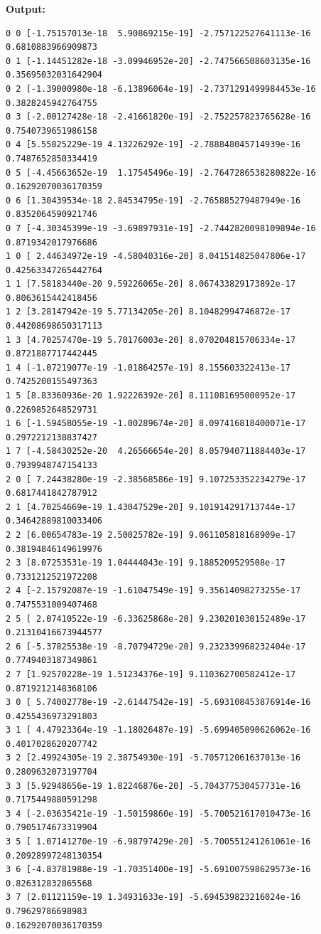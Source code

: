 \documentclass{article}
\begin{document}
\textbf{Output:}\begin{verbatim}
0 0 [-1.75157013e-18  5.90869215e-19] -2.757122527641113e-16 0.6810883966909873
0 1 [-1.14451282e-18 -3.09946952e-20] -2.747566508603135e-16 0.35695032031642904
0 2 [-1.39000980e-18 -6.13896064e-19] -2.7371291499984453e-16 0.3828245942764755
0 3 [-2.00127428e-18 -2.41661820e-19] -2.752257823765628e-16 0.7540739651986158
0 4 [5.55825229e-19 4.13226292e-19] -2.788848045714939e-16 0.7487652850334419
0 5 [-4.45663652e-19  1.17545496e-19] -2.7647286538280822e-16 0.16292070036170359
0 6 [1.30439534e-18 2.84534795e-19] -2.765885279487949e-16 0.8352064590921746
0 7 [-4.30345399e-19 -3.69897931e-19] -2.7442820098109894e-16 0.8719342017976686
1 0 [ 2.44634972e-19 -4.58040316e-20] 8.041514825047806e-17 0.42563347265442764
1 1 [7.58183440e-20 9.59226065e-20] 8.067433829173892e-17 0.8063615442418456
1 2 [3.28147942e-19 5.77134205e-20] 8.10482994746872e-17 0.44208698650317113
1 3 [4.70257470e-19 5.70176003e-20] 8.070204815706334e-17 0.8721887717442445
1 4 [-1.07219077e-19 -1.01864257e-19] 8.155603322413e-17 0.7425200155497363
1 5 [8.83360936e-20 1.92226392e-20] 8.111081695000952e-17 0.2269852648529731
1 6 [-1.59458055e-19 -1.00289674e-20] 8.097416818400071e-17 0.2972212138837427
1 7 [-4.58430252e-20  4.26566654e-20] 8.057940711884403e-17 0.7939948747154133
2 0 [ 7.24438280e-19 -2.38568586e-19] 9.107253352234279e-17 0.6817441842787912
2 1 [4.70254669e-19 1.43047529e-20] 9.101914291713744e-17 0.34642889810033406
2 2 [6.00654783e-19 2.50025782e-19] 9.061105818168909e-17 0.38194846149619976
2 3 [8.07253531e-19 1.04444043e-19] 9.1885209529508e-17 0.7331212521972208
2 4 [-2.15792087e-19 -1.61047549e-19] 9.35614098273255e-17 0.7475531009407468
2 5 [ 2.07410522e-19 -6.33625868e-20] 9.230201030152489e-17 0.21310416673944577
2 6 [-5.37825538e-19 -8.70794729e-20] 9.232339968232404e-17 0.7749403187349861
2 7 [1.92570228e-19 1.51234376e-19] 9.110362700582412e-17 0.8719212148368106
3 0 [ 5.74002778e-19 -2.61447542e-19] -5.693108453876914e-16 0.4255436973291803
3 1 [ 4.47923364e-19 -1.18026487e-19] -5.699405090626062e-16 0.4017028620207742
3 2 [2.49924305e-19 2.38754930e-19] -5.705712061637013e-16 0.2809632073197704
3 3 [5.92948656e-19 1.82246876e-20] -5.704377530457731e-16 0.7175449880591298
3 4 [-2.03635421e-19 -1.50159860e-19] -5.700521617010473e-16 0.7905174673319904
3 5 [ 1.07141270e-19 -6.98797429e-20] -5.700551241261061e-16 0.20928997248130354
3 6 [-4.83781988e-19 -1.70351400e-19] -5.691007598629573e-16 0.826312832865568
3 7 [2.01121159e-19 1.34931633e-19] -5.694539823216024e-16 0.79629786698983
0.16292070036170359

\end{verbatim}
\end{document}
